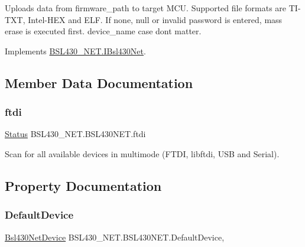 Uploads data from firmware\+\_\+path to target M\+CU. Supported file formats are T\+I-\/\+T\+XT, Intel-\/\+H\+EX and E\+LF. If none, null or invalid password is entered, mass erase is executed first. device\+\_\+name case dont matter. 



Implements \mbox{\hyperlink{interface_b_s_l430___n_e_t_1_1_i_bsl430_net_a3bc860bea764dd0ad0ee9c7a05fe4ecc}{B\+S\+L430\+\_\+\+N\+E\+T.\+I\+Bsl430\+Net}}.



\subsection{Member Data Documentation}
\mbox{\label{class_b_s_l430___n_e_t_1_1_b_s_l430_n_e_t_a991fc7208aa2b44a860db8a69db11f35}} 
\subsubsection{\texorpdfstring{ftdi}{ftdi}}
{\footnotesize\ttfamily \mbox{\hyperlink{class_b_s_l430___n_e_t_1_1_status}{Status}} B\+S\+L430\+\_\+\+N\+E\+T.\+B\+S\+L430\+N\+E\+T.\+ftdi}



Scan for all available devices in multimode (F\+T\+DI, libftdi, U\+SB and Serial). 



\subsection{Property Documentation}
\mbox{\label{class_b_s_l430___n_e_t_1_1_b_s_l430_n_e_t_a42cd02015803b28be0cf56880404ea07}} 
\subsubsection{\texorpdfstring{DefaultDevice}{DefaultDevice}}
{\footnotesize\ttfamily \mbox{\hyperlink{class_b_s_l430___n_e_t_1_1_bsl430_net_device}{Bsl430\+Net\+Device}} B\+S\+L430\+\_\+\+N\+E\+T.\+B\+S\+L430\+N\+E\+T.\+Default\+Device\hspace{0.3cm}{\ttfamily [get]}, {\ttfamily [set]}}



